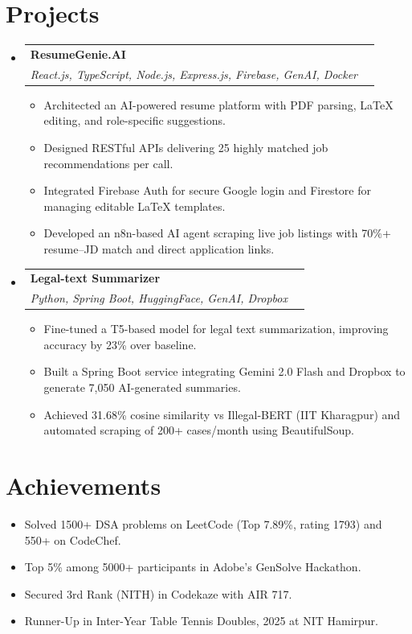 \documentclass[a4paper,11pt]{article}
\makeatletter
\newcommand{\resumeItem}[1]{
  \item \small{#1 \vspace{-2pt}}
}
\newcommand{\resumeSubheading}[4]{
  \vspace{-2pt}\item
  \begin{tabular*}{\textwidth}{l@{\extracolsep{\fill}}r}
    \textbf{#1} & #2 \\
    \textit{#3} & \textit{#4} \\
  \end{tabular*}\vspace{-6pt}
}
\newcommand{\resumeItemListStart}{\begin{itemize}[leftmargin=0.15in]}
\newcommand{\resumeItemListEnd}{\end{itemize}}
\makeatother
\begin{document}
\section{Projects}
\begin{itemize}[leftmargin=0.15in]

  \resumeSubheading
    {ResumeGenie.AI}{}
    {React.js, TypeScript, Node.js, Express.js, Firebase, GenAI, Docker}{}

    \resumeItemListStart
      \resumeItem{Architected an AI-powered resume platform with PDF parsing, LaTeX editing, and role-specific suggestions.}
      \resumeItem{Designed RESTful APIs delivering 25 highly matched job recommendations per call.}
      \resumeItem{Integrated Firebase Auth for secure Google login and Firestore for managing editable LaTeX templates.}
      \resumeItem{Developed an n8n-based AI agent scraping live job listings with 70\%+ resume–JD match and direct application links.}
    \resumeItemListEnd

  \resumeSubheading
    {Legal-text Summarizer}{}
    {Python, Spring Boot, HuggingFace, GenAI, Dropbox}{}

    \resumeItemListStart
      \resumeItem{Fine-tuned a T5-based model for legal text summarization, improving accuracy by 23\% over baseline.}
      \resumeItem{Built a Spring Boot service integrating Gemini 2.0 Flash and Dropbox to generate 7,050 AI-generated summaries.}
      \resumeItem{Achieved 31.68\% cosine similarity vs Illegal-BERT (IIT Kharagpur) and automated scraping of 200+ cases/month using BeautifulSoup.}
    \resumeItemListEnd

\end{itemize}

\section{Achievements}
\begin{itemize}[leftmargin=0.15in]
  \item \small{Solved 1500+ DSA problems on LeetCode (Top 7.89\%, rating 1793) and 550+ on CodeChef.}
  \item \small{Top 5\% among 5000+ participants in Adobe’s GenSolve Hackathon.}
  \item \small{Secured 3rd Rank (NITH) in Codekaze with AIR 717.}
  \item \small{Runner-Up in Inter-Year Table Tennis Doubles, 2025 at NIT Hamirpur.}
\end{itemize}
\end{document}
